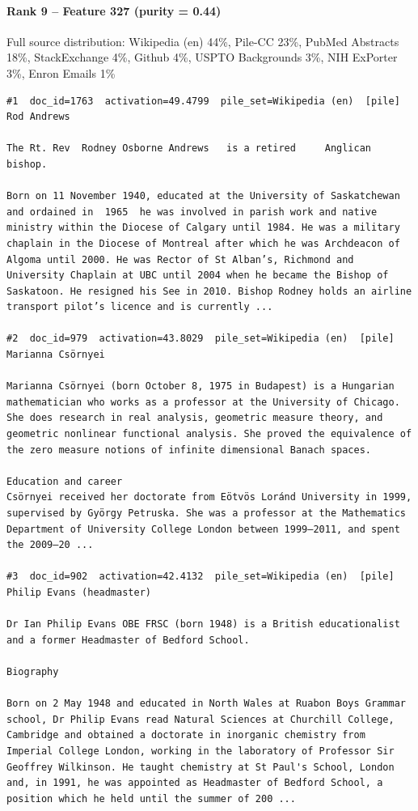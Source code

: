 
\paragraph*{Rank 9 -- Feature 327 (purity = 0.44)}

Full source distribution: Wikipedia (en) 44\%, Pile-CC 23\%, PubMed Abstracts 18\%, StackExchange 4\%, Github 4\%, USPTO Backgrounds 3\%, NIH ExPorter 3\%, Enron Emails 1\%

\begin{verbatim}
#1  doc_id=1763  activation=49.4799  pile_set=Wikipedia (en)  [pile]
Rod Andrews

The Rt. Rev  Rodney Osborne Andrews   is a retired     Anglican bishop.

Born on 11 November 1940, educated at the University of Saskatchewan and ordained in  1965  he was involved in parish work and native ministry within the Diocese of Calgary until 1984. He was a military chaplain in the Diocese of Montreal after which he was Archdeacon of Algoma until 2000. He was Rector of St Alban’s, Richmond and University Chaplain at UBC until 2004 when he became the Bishop of Saskatoon. He resigned his See in 2010. Bishop Rodney holds an airline transport pilot’s licence and is currently ...

#2  doc_id=979  activation=43.8029  pile_set=Wikipedia (en)  [pile]
Marianna Csörnyei

Marianna Csörnyei (born October 8, 1975 in Budapest) is a Hungarian mathematician who works as a professor at the University of Chicago. She does research in real analysis, geometric measure theory, and geometric nonlinear functional analysis. She proved the equivalence of the zero measure notions of infinite dimensional Banach spaces.

Education and career
Csörnyei received her doctorate from Eötvös Loránd University in 1999, supervised by György Petruska. She was a professor at the Mathematics Department of University College London between 1999–2011, and spent the 2009–20 ...

#3  doc_id=902  activation=42.4132  pile_set=Wikipedia (en)  [pile]
Philip Evans (headmaster)

Dr Ian Philip Evans OBE FRSC (born 1948) is a British educationalist and a former Headmaster of Bedford School.

Biography

Born on 2 May 1948 and educated in North Wales at Ruabon Boys Grammar school, Dr Philip Evans read Natural Sciences at Churchill College, Cambridge and obtained a doctorate in inorganic chemistry from Imperial College London, working in the laboratory of Professor Sir Geoffrey Wilkinson. He taught chemistry at St Paul's School, London and, in 1991, he was appointed as Headmaster of Bedford School, a position which he held until the summer of 200 ...


\end{verbatim}
